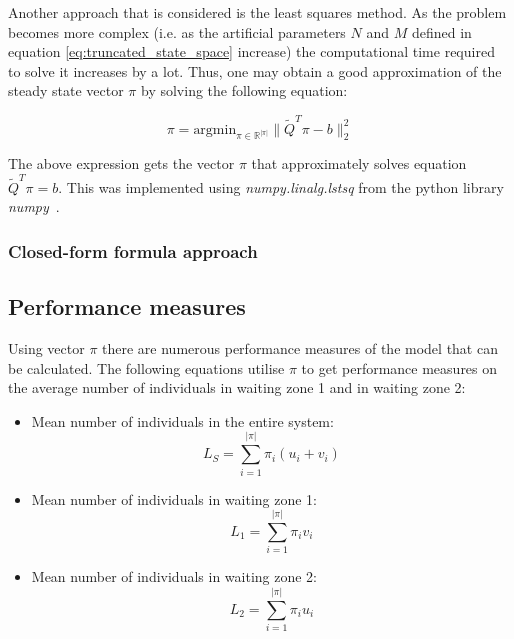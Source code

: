 Another approach that is considered is the least squares method. 
As the problem becomes more complex (i.e. as the artificial parameters \(N\)
and \(M\) defined in equation \ref{eq:truncated_state_space} increase)
the computational time required to solve it increases by a lot.
Thus, one may obtain a good approximation of the steady state vector \( \pi \)
by solving the following equation:

\begin{equation}
    \pi = \text{argmin}_{\pi \in \mathbb{R}^{|\pi|}}\|\tilde Q^T \pi - b\|_2^2
\end{equation}

The above expression gets the vector \( \pi \) that approximately solves 
equation \(\tilde Q^T \pi = b\).
This was implemented using \textit{numpy.linalg.lstsq} from the python 
library \textit{numpy}~\cite{2020NumPy-Array}.

\subsubsection{Closed-form formula approach}

\subsection{Performance measures}
Using vector \(\pi\) there are numerous performance measures of the model that
can be calculated.
The following equations utilise \(\pi\) to get performance measures on the
average number of individuals in waiting zone 1 and in waiting zone 2:

\begin{itemize}
    \item Mean number of individuals in the entire system:
        \begin{equation}
            L_S = \sum_{i=1}^{|\pi|} \pi_i (u_i + v_i)
        \end{equation}
    \item Mean number of individuals in waiting zone 1:
        \begin{equation}
            L_1 = \sum_{i=1}^{|\pi|} \pi_i v_i
        \end{equation}
    \item Mean number of individuals in waiting zone 2:
        \begin{equation}
            L_2 = \sum_{i=1}^{|\pi|} \pi_i u_i
        \end{equation}
\end{itemize}

